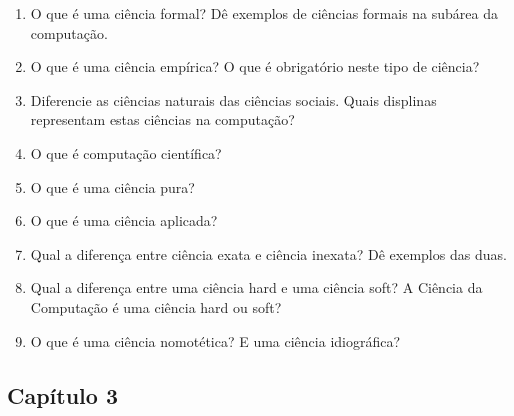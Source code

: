\documentclass{article}
\begin{document}
\begin{enumerate}

    \item O que é uma ciência formal? Dê exemplos de ciências formais na subárea da computação.
    \item O que é uma ciência empírica? O que é obrigatório neste tipo de ciência?
    \item Diferencie as ciências naturais das ciências sociais. Quais displinas representam estas ciências na computação?
    \item O que é computação científica?
    \item O que é uma ciência pura?
    \item O que é uma ciência aplicada?
    \item Qual a diferença entre ciência exata e ciência inexata? Dê exemplos das duas.
    \item Qual a diferença entre uma ciência hard e uma ciência soft? A Ciência da Computação é uma ciência hard ou soft?
    \item O que é uma ciência nomotética? E uma ciência idiográfica?

\end{enumerate}

\subsection{Capítulo 3}
\end{document}
